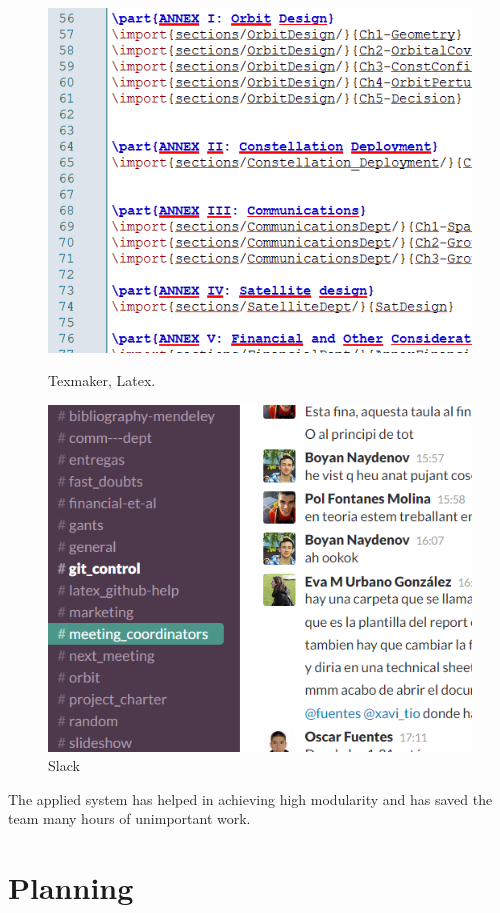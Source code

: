 \begin{figure}[!htb]
%
  \includegraphics[width=\linewidth]{latex.png}
  \caption{Texmaker, Latex.}\label{fig:latex}
\endminipage
{}%
  \includegraphics[width=\linewidth]{slack.png}
  \caption{Slack}\label{fig:slack}
\endminipage
\end{figure}


The applied system has helped in achieving high modularity and has saved the team many hours of unimportant work.


\section{Planning}

